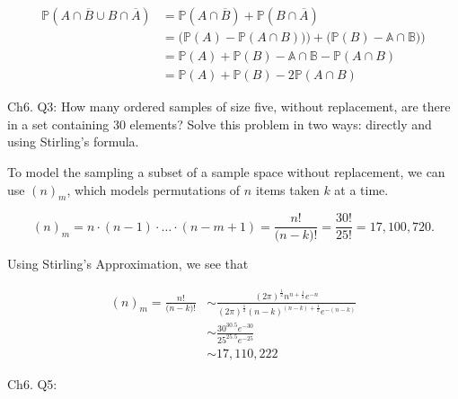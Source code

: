 \documentclass[12pt]{article}
\begin{document}
\begin{align*}
\mathbb{P}(A \cap \overline{B} \cup B \cap \overline{A}) & = \mathbb{P}(A \cap \overline{B}) + \mathbb{P}(B \cap \overline{A})  \\
& = \big ( \mathbb{P}(A) - \mathbb{P}(A \cap B)) \big ) + \big ( \mathbb{P}(B) - \mathbb{A \cap B}) \big ) \\
& = \mathbb{P}(A)  +  \mathbb{P}(B) - \mathbb{A \cap B} - \mathbb{P}(A \cap B) \\
& = \mathbb{P}(A)  +  \mathbb{P}(B) - 2 \mathbb{P}(A \cap B)
\end{align*}
\vspace{.5cm}

\noindent
Ch6. Q3: How many ordered samples of size five, without replacement, are there in a set containing 30 elements? Solve this problem in two ways: directly and using Stirling's formula.

\vspace{.3cm}
\noindent
To model the sampling a subset of a sample space without replacement, we can use $(n)_m$, which models permutations of $n$ items taken $k$ at a time.

\begin{equation*}
(n)_m = n \cdot (n-1) \cdot \ldots \cdot (n-m+1) = \frac{n!}{ \big ( n - k \big )!} = \frac{30!}{25!} = 17,100,720.
\end{equation*}

Using Stirling's Approximation, we see that

\begin{align*}
(n)_m =  \frac{n!}{ \big ( n - k \big )!} & \sim \frac{(2 \pi)^{\frac{1}{2}}n^{n+\frac{1}{2}}e^{-n}}{ (2 \pi)^{\frac{1}{2}}(n-k)^{(n-k)+\frac{1}{2}}e^{-(n-k)} } \\
& \sim \frac{30^{30.5}e^{-30}}{ 25^{25.5}e^{-25} } \\
& \sim 17,110,222
\end{align*}

\vspace{.5cm}

\noindent
Ch6. Q5: 
\end{document}

